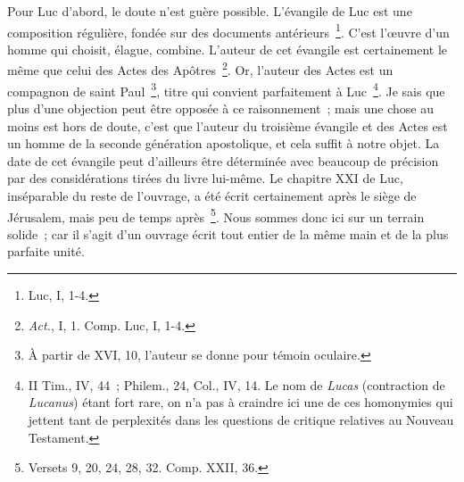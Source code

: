 \documentclass[french,twoside]{book} %
\begin{document}
Pour Luc d’abord, le doute n’est guère possible. L’évangile de Luc est une composition régulière, fondée sur des documents antérieurs \footnote{Luc, I, 1-4.}. C’est l’œuvre d’un homme qui choisit, élague, combine. L’auteur de cet évangile est certainement le même que celui des Actes des Apôtres \footnote{{\itshape Act.}, I, 1. Comp. Luc, I, 1-4.}. Or, l’auteur des Actes est un compagnon de saint Paul \footnote{ À partir de XVI, 10, l’auteur se donne pour témoin oculaire.}, titre qui convient parfaitement à Luc \footnote{ II Tim., IV, 44 ; Philem., 24, Col., IV, 14. Le nom de {\itshape Lucas} (contraction de {\itshape Lucanus}) étant fort rare, on n’a pas à craindre ici une de ces homonymies qui jettent tant de perplexités dans les questions de critique relatives au Nouveau Testament.}. Je sais que plus d’une objection peut être opposée à ce raisonnement ; mais une chose au moins est hors de doute, c’est que l’auteur du troisième évangile et des Actes est un homme de la seconde génération apostolique, et cela suffit à notre objet. La date de cet évangile peut d’ailleurs être déterminée avec beaucoup de précision par des considérations tirées du livre lui-même. Le chapitre XXI de Luc, inséparable du reste de l’ouvrage, a été écrit certainement après le siège de Jérusalem, mais peu de temps après \footnote{Versets 9, 20, 24, 28, 32. Comp. XXII, 36.}. Nous sommes donc ici sur un terrain solide ; car il s’agit d’un ouvrage écrit tout entier de la même main et de la plus parfaite unité.\par
\end{document}
